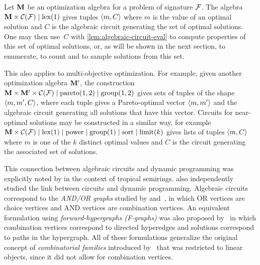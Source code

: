 \begin{example}\label{ex:construct-circ-optimal}
    Let \(\mathbf{M}\) be an optimization algebra for a problem of signature \(\mathcal{F}\).
    The algebra \(\mathbf{M} \times \mathcal{C}(\mathcal{F}) \mid \mathrm{lex}(1)\) gives tuples \(\left\langle m, C\right\rangle\) where \(m\) is the value of an optimal solution and \(C\) is the algebraic circuit generating the set of optimal solutions.
    One may then use~\(C\) with \cref{lem:algebraic-circuit-eval} to compute properties of this set of optimal solutions, or, as will be shown in the next section, to enumerate, to count and to sample solutions from this set.

    This also applies to multi-objective optimization.
    For example, given another optimization algebra \(\mathbf{M}'\), the construction \(\mathbf{M} \times \mathbf{M}' \times \mathcal{C}(\mathcal{F}) \mid \mathrm{pareto}(1,2) \mid \mathrm{group}(1,2)\) gives sets of tuples of the shape \(\left\langle m, m', C\right\rangle\), where each tuple gives a Pareto-optimal vector \(\left\langle m, m'\right\rangle\) and the algebraic circuit generating all solutions that have this vector.
    Circuits for near-optimal solutions may be constructed in a similar way, for example \(\mathbf{M} \times \mathcal{C}(\mathcal{F}) \mid \mathrm{lex}(1) \mid \mathrm{power} \mid \mathrm{group}(1) \mid \mathrm{sort} \mid \mathrm{limit}(k)\) gives lists of tuples \(\left\langle m, C\right\rangle\) where \(m\) is one of the \(k\) distinct optimal values and \(C\) is the circuit generating the associated set of solutions.
\end{example}

This connection between algebraic circuits and dynamic programming was explicitly noted by \textcite{Jukna2015LowerBoundsTropical} in the context of tropical semirings.
\textcite{Mankowski2021DynamicProgrammingMultiObjective} also independently studied the link between circuits and dynamic programming.
Algebraic circuits correspond to the \emph{AND/OR graphs} studied by \textcite{Gnesi1981DynamicProgrammingGraph} and~\textcite{Wang2021GeneralFrameworkEnumerating}, in which OR vertices are choice vertices and AND vertices are combination vertices.
An equivalent formulation using \emph{forward-hypergraphs (F-graphs)} was also proposed by~\textcite{Ponty2011CombinatorialFrameworkDesigning} in which combination vertices correspond to directed hyperedges and solutions correspond to paths in the hypergraph.
All of these formulations generalize the original concept of \emph{combinatorial families} introduced by~\textcite{Wilf1977UnifiedSettingSequencing} that was restricted to linear objects, since it did not allow for combination vertices.

